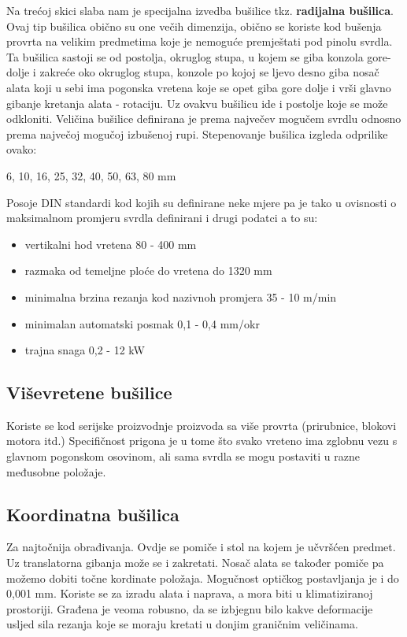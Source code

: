 \documentclass[a4paper,12pt]{article}
\numberwithin{figure}{section}
\begin{document}
Na trećoj skici slaba nam je specijalna izvedba bušilice tkz. \textbf{radijalna bušilica}. Ovaj tip bušilica obično su one večih dimenzija, obično se koriste kod bušenja provrta na velikim predmetima koje je nemoguće premještati pod pinolu svrdla. Ta bušilica sastoji se od postolja, okruglog stupa, u kojem se giba konzola gore-dolje i zakreće oko okruglog stupa, konzole po kojoj se ljevo desno giba nosač alata koji u sebi ima pogonska vretena koje se opet giba gore dolje i vrši glavno gibanje kretanja alata - rotaciju. Uz ovakvu bušilicu ide i postolje koje se može odkloniti. Veličina bušilice definirana je prema največev mogučem svrdlu odnosno prema največoj mogučoj izbušenoj rupi. Stepenovanje bušilica izgleda odprilike ovako:
\begin{center}
6, 10, 16, 25, 32, 40, 50, 63, 80 mm
\end{center}
Posoje DIN standardi kod kojih su definirane neke mjere pa je tako u ovisnosti o maksimalnom promjeru svrdla definirani i drugi podatci a to su:
\begin{itemize}
\item vertikalni hod vretena 80 - 400 mm
\item razmaka od temeljne ploće do vretena do 1320 mm
\item minimalna brzina rezanja kod nazivnoh promjera  35 - 10 m/min
\item minimalan automatski posmak 0,1 - 0,4 mm/okr
\item trajna snaga 0,2 - 12 kW
\end{itemize}
\subsection{Viševretene bušilice}
Koriste se kod serijske proizvodnje proizvoda sa više provrta (prirubnice, blokovi motora itd.) Specifičnost prigona je u tome što svako vreteno ima zglobnu vezu s glavnom pogonskom osovinom, ali sama svrdla se mogu postaviti u razne međusobne položaje.
\subsection{Koordinatna bušilica}
Za najtočnija obrađivanja. Ovdje se pomiče i stol na kojem je učvršćen predmet. Uz translatorna gibanja može se i zakretati. Nosač alata se također pomiče pa možemo dobiti točne kordinate položaja. Mogučnost optičkog postavljanja je i do 0,001 mm. Koriste se za izradu alata i naprava, a mora biti u klimatiziranoj prostoriji. Građena je veoma robusno, da se izbjegnu bilo kakve deformacije usljed sila rezanja koje se moraju kretati u donjim graničnim veličinama.
\end{document}
